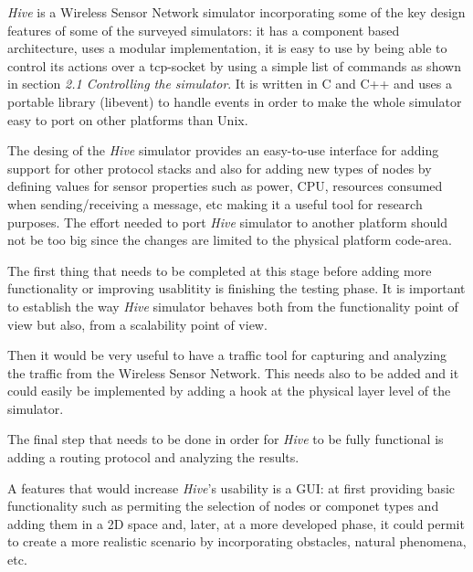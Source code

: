 \textit{Hive} is a Wireless Sensor Network simulator incorporating some of the
key design features of some of the surveyed simulators: it has a component
based architecture, uses a modular implementation, it is easy to use by being
able to control its actions over a tcp-socket by using a simple list of
commands as shown in section \textit{2.1 Controlling the simulator}.
It is written in C and C++ and uses a portable library (libevent) to handle
events in order to make the whole simulator easy to port on other platforms
than Unix.

The desing of the \textit{Hive} simulator provides an easy-to-use interface
for adding support for other protocol stacks and also for adding new types of
nodes by defining values for sensor properties such as power, CPU, resources
consumed when sending/receiving a message, etc making it a useful tool for
research purposes.
The effort needed to port \textit{Hive} simulator to another platform should
not be too big since the changes are limited to the physical platform
code-area.

The first thing that needs to be completed at this stage before adding more
functionality or improving usablitity is finishing the testing phase. It is
important to establish the way \textit{Hive} simulator behaves both from the
functionality point of view but also, from a scalability point of view.

Then it would be very useful to have a traffic tool for capturing and
analyzing the traffic from the Wireless Sensor Network. This needs also to be
added and it could easily be implemented by adding a hook at
the physical layer level of the simulator.

The final step that needs to be done in order for \textit{Hive} to be fully
functional is adding a routing protocol and analyzing the results.

A features that would increase \textit{Hive}'s usability is a GUI: at first
providing basic functionality such as permiting the selection of nodes
or componet types and adding them in a 2D space and, later, at a more developed phase, it could
permit to create a more realistic scenario by incorporating obstacles, natural
phenomena, etc.  
